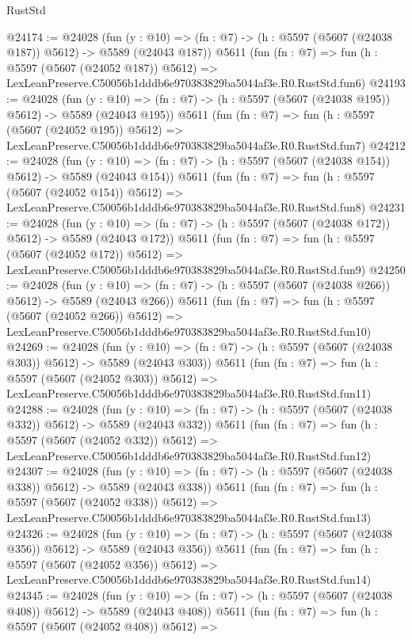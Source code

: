 \begin{lexlean}{RustStd}
\begin{coremodule}
@24174 := @24028
    (fun (y : @10) => (fn : @7) -> (h : @5597 (@5607 (@24038 @187)) @5612) -> @5589 (@24043 @187))
    @5611
    (fun (fn : @7) =>
    fun (h : @5597 (@5607 (@24052 @187)) @5612) =>
    LexLeanPreserve.C50056b1dddb6e970383829ba5044af3e.R0.RustStd.fun6)
@24193 := @24028
    (fun (y : @10) => (fn : @7) -> (h : @5597 (@5607 (@24038 @195)) @5612) -> @5589 (@24043 @195))
    @5611
    (fun (fn : @7) =>
    fun (h : @5597 (@5607 (@24052 @195)) @5612) =>
    LexLeanPreserve.C50056b1dddb6e970383829ba5044af3e.R0.RustStd.fun7)
@24212 := @24028
    (fun (y : @10) => (fn : @7) -> (h : @5597 (@5607 (@24038 @154)) @5612) -> @5589 (@24043 @154))
    @5611
    (fun (fn : @7) =>
    fun (h : @5597 (@5607 (@24052 @154)) @5612) =>
    LexLeanPreserve.C50056b1dddb6e970383829ba5044af3e.R0.RustStd.fun8)
@24231 := @24028
    (fun (y : @10) => (fn : @7) -> (h : @5597 (@5607 (@24038 @172)) @5612) -> @5589 (@24043 @172))
    @5611
    (fun (fn : @7) =>
    fun (h : @5597 (@5607 (@24052 @172)) @5612) =>
    LexLeanPreserve.C50056b1dddb6e970383829ba5044af3e.R0.RustStd.fun9)
@24250 := @24028
    (fun (y : @10) => (fn : @7) -> (h : @5597 (@5607 (@24038 @266)) @5612) -> @5589 (@24043 @266))
    @5611
    (fun (fn : @7) =>
    fun (h : @5597 (@5607 (@24052 @266)) @5612) =>
    LexLeanPreserve.C50056b1dddb6e970383829ba5044af3e.R0.RustStd.fun10)
@24269 := @24028
    (fun (y : @10) => (fn : @7) -> (h : @5597 (@5607 (@24038 @303)) @5612) -> @5589 (@24043 @303))
    @5611
    (fun (fn : @7) =>
    fun (h : @5597 (@5607 (@24052 @303)) @5612) =>
    LexLeanPreserve.C50056b1dddb6e970383829ba5044af3e.R0.RustStd.fun11)
@24288 := @24028
    (fun (y : @10) => (fn : @7) -> (h : @5597 (@5607 (@24038 @332)) @5612) -> @5589 (@24043 @332))
    @5611
    (fun (fn : @7) =>
    fun (h : @5597 (@5607 (@24052 @332)) @5612) =>
    LexLeanPreserve.C50056b1dddb6e970383829ba5044af3e.R0.RustStd.fun12)
@24307 := @24028
    (fun (y : @10) => (fn : @7) -> (h : @5597 (@5607 (@24038 @338)) @5612) -> @5589 (@24043 @338))
    @5611
    (fun (fn : @7) =>
    fun (h : @5597 (@5607 (@24052 @338)) @5612) =>
    LexLeanPreserve.C50056b1dddb6e970383829ba5044af3e.R0.RustStd.fun13)
@24326 := @24028
    (fun (y : @10) => (fn : @7) -> (h : @5597 (@5607 (@24038 @356)) @5612) -> @5589 (@24043 @356))
    @5611
    (fun (fn : @7) =>
    fun (h : @5597 (@5607 (@24052 @356)) @5612) =>
    LexLeanPreserve.C50056b1dddb6e970383829ba5044af3e.R0.RustStd.fun14)
@24345 := @24028
    (fun (y : @10) => (fn : @7) -> (h : @5597 (@5607 (@24038 @408)) @5612) -> @5589 (@24043 @408))
    @5611
    (fun (fn : @7) =>
    fun (h : @5597 (@5607 (@24052 @408)) @5612) =>

\end{coremodule}
\end{lexlean}
